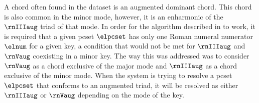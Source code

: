 
A chord often found in the dataset is an augmented dominant
chord. This chord is also common in the minor mode, however,
it is an enharmonic of the $\rnIIIaug$ triad of that mode.
In order for the algorithm described in
to work, it is required that a given \gls{pcset} $\elpcset$
has only one Roman numeral numerator $\elnum$ for a given
key, a condition that would not be met for $\rnIIIaug$ and
$\rnVaug$ coexisting in a minor key. The way this was
addressed was to consider $\rnVaug$ as a chord exclusive of
the major mode and $\rnIIIaug$ as a chord exclusive of the
minor mode. When the system is trying to resolve a
\gls{pcset} $\elpcset$ that conforms to an augmented triad,
it will be resolved as either $\rnIIIaug$ or $\rnVaug$
depending on the mode of the key. 
